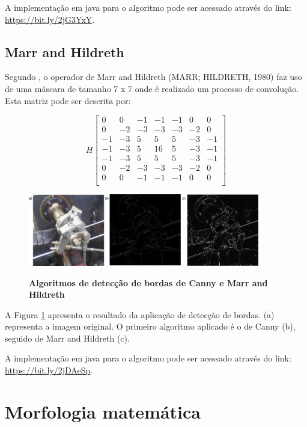 \documentclass[
	12pt,				%
	oneside,			%
	a4paper,			%
	english,			%
	french,				%
	spanish,			%
	brazil,				%
	]{abntex2}
\begin{document}
A implementação em java para o algoritmo pode ser acessado através do link: \url{https://bit.ly/2jG3YxY}.

\subsection{Marr and Hildreth}
Segundo \citet{pedriniSchwartz:2008}, o operador de Marr and Hildreth (MARR; HILDRETH, 1980) faz uso de uma máscara de tamanho 7 x 7 onde é realizado um processo de convolução. Esta matriz pode ser descrita por:

\[
H 
\begin{bmatrix}
     0 &  0 & -1 & -1 & -1 &  0 &  0            \\ 
     0 & -2 & -3 & -3 & -3 & -2 &  0            \\ 
    -1 & -3 &  5 &  5 &  5 & -3 & -1            \\ 
    -1 & -3 &  5 & 16 &  5 & -3 & -1            \\ 
    -1 & -3 &  5 &  5 &  5 & -3 & -1            \\ 
     0 & -2 & -3 & -3 & -3 & -2 &  0            \\ 
     0 &  0 & -1 & -1 & -1 &  0 &  0            \\ 
\end{bmatrix} 
\]

\begin{figure}[ht]
\centering
\caption{\textbf{Algoritmos de detecção de bordas de Canny e Marr and Hildreth}}
\includegraphics[width=0.9\textwidth]{imagens/deteccao_bordas2.png}
\sourceAuthor
\label{fig:deteccao_bordas2}
\end{figure}

A Figura \ref{fig:deteccao_bordas2} apresenta o resultado da aplicação de detecção de bordas. (a) representa a imagem original. O primeiro algoritmo aplicado é o de  Canny (b), seguido de Marr and Hildreth (c).

A implementação em java para o algoritmo pode ser acessado através do link: \url{https://bit.ly/2jDAeSp}.

\section{Morfologia matemática}
\end{document}
